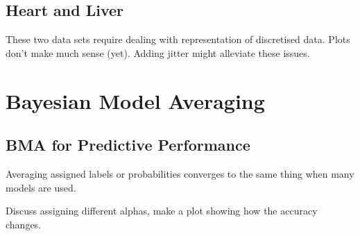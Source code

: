 \documentclass[a4paper,12pt ]{report}
\begin{document}
\begin{center}

\end{center}


\subsection{Heart and Liver}

These two data sets require dealing with representation of discretised data. Plots don't make much sense (yet). Adding jitter might alleviate these issues.  




\section{Bayesian Model Averaging}

\subsection{BMA for Predictive Performance}

Averaging assigned labels or probabilities converges to the same thing when many models are used. 

Discuss assigning different alphas, make a plot showing how the accuracy changes. 
\end{document}
